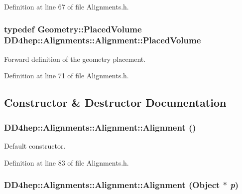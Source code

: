 Definition at line 67 of file Alignments.h.\hypertarget{class_d_d4hep_1_1_alignments_1_1_alignment_a69b234d416cfa4ace8a75322f2c58b66}{
\subsubsection[{PlacedVolume}]{\setlength{\rightskip}{0pt plus 5cm}typedef {\bf Geometry::PlacedVolume} {\bf DD4hep::Alignments::Alignment::PlacedVolume}}}
\label{class_d_d4hep_1_1_alignments_1_1_alignment_a69b234d416cfa4ace8a75322f2c58b66}


Forward definition of the geometry placement. 

Definition at line 71 of file Alignments.h.

\subsection{Constructor \& Destructor Documentation}
\hypertarget{class_d_d4hep_1_1_alignments_1_1_alignment_a3b4f4e5289181ce34cf88d4d59d40ad3}{
\subsubsection[{Alignment}]{\setlength{\rightskip}{0pt plus 5cm}DD4hep::Alignments::Alignment::Alignment ()}}
\label{class_d_d4hep_1_1_alignments_1_1_alignment_a3b4f4e5289181ce34cf88d4d59d40ad3}


Default constructor. 

Definition at line 83 of file Alignments.h.\hypertarget{class_d_d4hep_1_1_alignments_1_1_alignment_afb90531c93e16959b04cfe00ede8e9a1}{
\subsubsection[{Alignment}]{\setlength{\rightskip}{0pt plus 5cm}DD4hep::Alignments::Alignment::Alignment ({\bf Object} $\ast$ {\em p})}}
\label{class_d_d4hep_1_1_alignments_1_1_alignment_afb90531c93e16959b04cfe00ede8e9a1}


